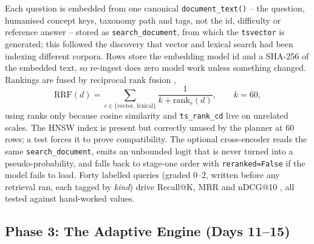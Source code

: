 \documentclass{tietreport}
\begin{document}
Each question is embedded from one canonical \texttt{document\_text()} -- the question, humanised
concept keys, taxonomy path and tags, not the id, difficulty or reference answer -- stored as
\texttt{search\_document}, from which the \texttt{tsvector} is generated; this followed the discovery
that vector and lexical search had been indexing different corpora. Rows store the embedding
model id and a SHA-256 of the embedded text, so re-ingest does zero model work unless something
changed. Rankings are fused by reciprocal rank fusion \cite{cormack2009rrf},
\begin{equation}
  \mathrm{RRF}(d) = \sum_{r\in\{\text{vector},\,\text{lexical}\}} \frac{1}{k+\mathrm{rank}_r(d)}, \qquad k=60,
  \label{eq:rrf}
\end{equation}
using ranks only because cosine similarity and \texttt{ts\_rank\_cd} live on unrelated scales.
The HNSW index is present but correctly unused by the planner at 60 rows; a test forces it to
prove compatibility. The optional cross-encoder \cite{nogueira2019bert} reads the same
\texttt{search\_document}, emits an unbounded logit that is never turned into a pseudo-probability,
and falls back to stage-one order with \texttt{reranked=False} if the model fails to load. Forty
labelled queries (graded 0--2, written before any retrieval ran, each tagged by \emph{kind}) drive
Recall@K, MRR and nDCG@10 \cite{jarvelin2002ndcg}, all tested against hand-worked values.

\subsection{Phase 3: The Adaptive Engine (Days 11--15)}
\label{sec:engine}
\end{document}
